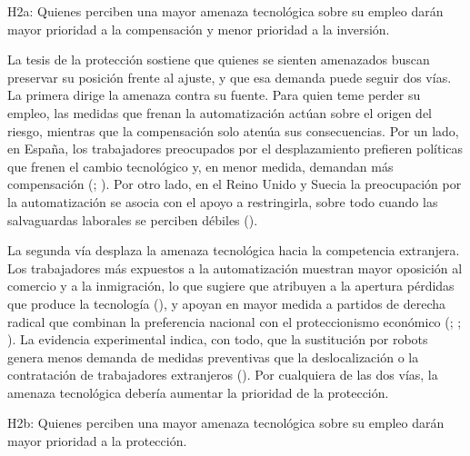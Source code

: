 \documentclass[
  spanish,
  12pt,
]{article}
\begin{document}
\begin{tcolorbox}[enhanced jigsaw, arc=.35mm, bottomrule=.15mm, breakable, colback=white, colframe=quarto-callout-note-color-frame, left=2mm, leftrule=.75mm, opacityback=0, rightrule=.15mm, toprule=.15mm]

H2a: Quienes perciben una mayor amenaza tecnológica sobre su empleo
darán mayor prioridad a la compensación y menor prioridad a la
inversión.

\end{tcolorbox}

La tesis de la protección sostiene que quienes se sienten amenazados
buscan preservar su posición frente al ajuste, y que esa demanda puede
seguir dos vías. La primera dirige la amenaza contra su fuente. Para
quien teme perder su empleo, las medidas que frenan la automatización
actúan sobre el origen del riesgo, mientras que la compensación solo
atenúa sus consecuencias. Por un lado, en España, los trabajadores
preocupados por el desplazamiento prefieren políticas que frenen el
cambio tecnológico y, en menor medida, demandan más compensación
(;
). Por
otro lado, en el Reino Unido y Suecia la preocupación por la
automatización se asocia con el apoyo a restringirla, sobre todo cuando
las salvaguardas laborales se perciben débiles
().

La segunda vía desplaza la amenaza tecnológica hacia la competencia
extranjera. Los trabajadores más expuestos a la automatización muestran
mayor oposición al comercio y a la inmigración, lo que sugiere que
atribuyen a la apertura pérdidas que produce la tecnología
(), y apoyan en mayor
medida a partidos de derecha radical que combinan la preferencia
nacional con el proteccionismo económico
(;
;
). La evidencia
experimental indica, con todo, que la sustitución por robots genera
menos demanda de medidas preventivas que la deslocalización o la
contratación de trabajadores extranjeros
(). Por cualquiera
de las dos vías, la amenaza tecnológica debería aumentar la prioridad de
la protección.

\begin{tcolorbox}[enhanced jigsaw, arc=.35mm, bottomrule=.15mm, breakable, colback=white, colframe=quarto-callout-note-color-frame, left=2mm, leftrule=.75mm, opacityback=0, rightrule=.15mm, toprule=.15mm]

H2b: Quienes perciben una mayor amenaza tecnológica sobre su empleo
darán mayor prioridad a la protección.

\end{tcolorbox}
\end{document}

